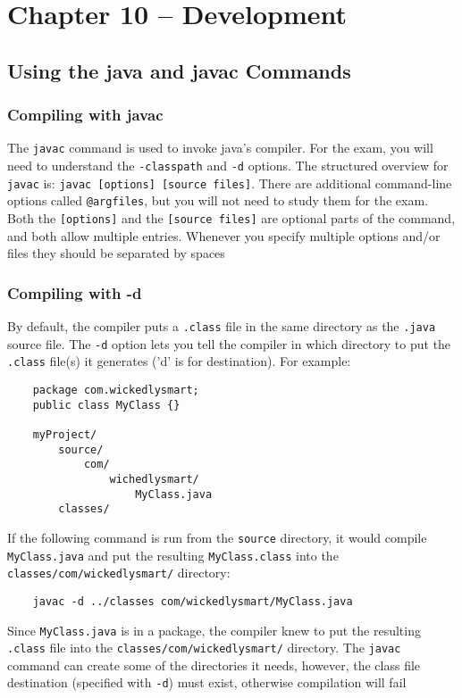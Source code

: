 \section{Chapter 10 -- Development}
\subsection{Using the java and javac Commands}
\subsubsection{Compiling with javac}
The \verb#javac# command is used to invoke java's compiler. For the exam, you 
will need to understand the \verb#-classpath# and \verb#-d# options. The 
structured overview for \verb#javac# is: \verb#javac [options] [source files]#.
There are additional command-line options called \verb#@argfiles#, but you will 
not need to study them for the exam. Both the \verb#[options]# and the 
\verb#[source files]# are optional parts of the command, and both allow 
multiple entries. Whenever you specify multiple options and/or files they 
should be separated by spaces

\subsubsection{Compiling with -d}
By default, the compiler puts a \verb#.class# file in the same directory as the 
\verb#.java# source file. The \verb#-d# option lets you tell the compiler in 
which directory to put the \verb#.class# file(s) it generates ('d' is for 
destination). For example:
\begin{verbatim}
    package com.wickedlysmart;
    public class MyClass {}

    myProject/
        source/
            com/
                wichedlysmart/
                    MyClass.java
        classes/
\end{verbatim}
If the following command is run from the \verb#source# directory, it would 
compile \verb#MyClass.java# and put the resulting \verb#MyClass.class# into the 
\verb#classes/com/wickedlysmart/# directory:
\begin{verbatim}
    javac -d ../classes com/wickedlysmart/MyClass.java
\end{verbatim}
Since \verb#MyClass.java# is in a package, the compiler knew to put the 
resulting \verb#.class# file into the \verb#classes/com/wickedlysmart/# 
directory. The \verb#javac# command can create some of the directories it 
needs, however, the class file destination (specified with \verb#-d#) must 
exist, otherwise compilation will fail

